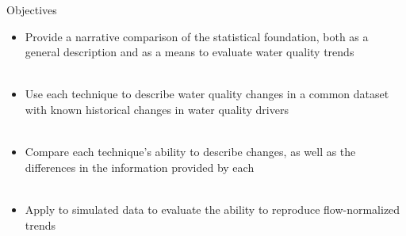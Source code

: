 \documentclass[serif]{beamer}\usepackage[]{graphicx}\usepackage[]{color}
\begin{document}
\begin{frame}{Objectives}
\begin{itemize}
\item Provide a narrative comparison of the statistical foundation, both as a general description and as a means to evaluate water quality trends \\~\\
\item Use each technique to describe water quality changes in a common dataset with known historical changes in water quality drivers \\~\\
\item Compare each technique's ability to describe changes, as well as the differences in the information provided by each \\~\\
\item Apply to simulated data to evaluate the ability to reproduce flow-normalized trends
\end{itemize}
\end{frame}
\end{document}
